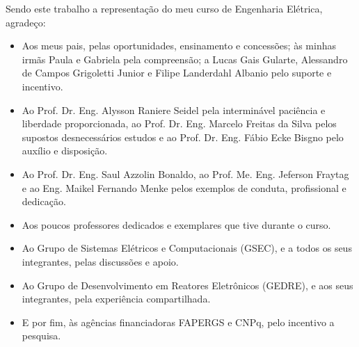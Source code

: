 Sendo este trabalho a representação do meu curso de Engenharia Elétrica, agradeço:

\begin{itemize}[label=-, labelwidth=6pt, itemindent=\parindent, listparindent=0pt, topsep=0pt, partopsep=0pt, parsep=0pt, itemsep=0pt, leftmargin=0pt, rightmargin=0pt]
	\item Aos meus pais, pelas oportunidades, ensinamento e concessões; às minhas irmãs Paula e Gabriela pela compreensão; a Lucas Gais Gularte, Alessandro de Campos Grigoletti Junior e Filipe Landerdahl Albanio pelo suporte e incentivo.
	\item Ao Prof. Dr. Eng. Alysson Raniere Seidel pela interminável paciência e liberdade proporcionada, ao Prof. Dr. Eng. Marcelo Freitas da Silva pelos supostos desnecessários estudos e ao Prof. Dr. Eng. Fábio Ecke Bisgno pelo auxílio e disposição.
	\item Ao Prof. Dr. Eng. Saul Azzolin Bonaldo, ao Prof. Me. Eng. Jeferson Fraytag e ao Eng. Maikel Fernando Menke pelos exemplos de conduta, profissional e dedicação.
	\item Aos poucos professores dedicados e exemplares que tive durante o curso.
	\item Ao Grupo de Sistemas Elétricos e Computacionais (GSEC), e a todos os seus integrantes, pelas discussões e apoio.
	\item Ao Grupo de Desenvolvimento em Reatores Eletrônicos (GEDRE), e aos seus integrantes, pela experiência compartilhada.
	\item E por fim, às agências financiadoras FAPERGS e CNPq, pelo incentivo a pesquisa.
\end{itemize}